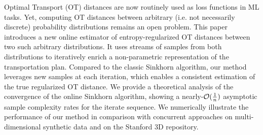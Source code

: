 Optimal Transport (OT) distances are now routinely used as loss functions in ML tasks. Yet, computing OT distances between arbitrary (i.e. not necessarily discrete) probability distributions remains an open problem. This paper introduces a new online estimator of entropy-regularized OT distances between two such arbitrary distributions. It uses streams of samples from both distributions to iteratively enrich a non-parametric representation of the transportation plan. Compared to the classic Sinkhorn algorithm, our method leverages new samples at each iteration, which enables a consistent estimation of the true regularized OT distance. We provide a theoretical analysis of the convergence of the online Sinkhorn algorithm, showing a nearly-$\mathcal{O}(\frac{1}{n})$ asymptotic sample complexity rates for the iterate sequence. We numerically illustrate the performance of our method in comparison with concurrent approaches on multi-dimensional synthetic data and on the Stanford 3D repository.